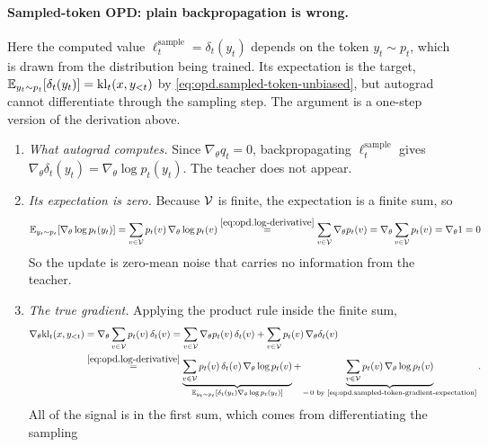 \paragraph{Sampled-token OPD: plain backpropagation is wrong.}
Here the computed value $\ell_t^{\mathrm{sample}}=\delta_t(y_t)$ depends on the token
$y_t\sim p_t$, which is drawn from the distribution being trained. Its expectation is
the target, $\mathbb{E}_{y_t\sim p_t}[\delta_t(y_t)]=\mathrm{kl}_t(x,y_{<t})$ by
\eqref{eq:opd.sampled-token-unbiased}, but autograd cannot differentiate through the
sampling step. The argument is a one-step version of the derivation above.
\begin{enumerate}
    \item \emph{What autograd computes.} Since $\nabla_\theta q_t=0$, backpropagating
    $\ell_t^{\mathrm{sample}}$ gives $\nabla_\theta\delta_t(y_t)=\nabla_\theta\log p_t(y_t)$.
    The teacher does not appear.
    \item \emph{Its expectation is zero.} Because ${\cal V}$ is finite, the expectation is
    a finite sum, so
    \begin{align}
        \mathbb{E}_{y_t\sim p_t}\!\left[\nabla_\theta\log p_t(y_t)\right]
        =
        \sum_{v\in{\cal V}}p_t(v)\,\nabla_\theta\log p_t(v)
        \overset{\eqref{eq:opd.log-derivative}}{=}
        \sum_{v\in{\cal V}}\nabla_\theta p_t(v)
        =
        \nabla_\theta\sum_{v\in{\cal V}}p_t(v)
        =
        \nabla_\theta 1
        =
        0 
        \label{eq:opd.sampled-token-gradient-expectation}
    \end{align}
    So the update is zero-mean noise that carries no information from the teacher.
    \item \emph{The true gradient.} Applying the product rule inside the finite sum,
    \begin{align*}
        \nabla_\theta\mathrm{kl}_t(x,y_{<t})
        &=
        \nabla_\theta\sum_{v\in{\cal V}}p_t(v)\,\delta_t(v)
        =
        \sum_{v\in{\cal V}}\nabla_\theta p_t(v)\,\delta_t(v)
        +
        \sum_{v\in{\cal V}}p_t(v)\,\nabla_\theta\delta_t(v)
        \\
        &\overset{\eqref{eq:opd.log-derivative}}{=}
        \underbrace{\sum_{v\in{\cal V}}p_t(v)\,\delta_t(v)\,\nabla_\theta\log p_t(v)}_{\mathbb{E}_{y_t\sim p_t}[\delta_t(y_t)\nabla_\theta\log p_t(y_t)]}
        +
        \underbrace{\sum_{v\in{\cal V}}p_t(v)\,\nabla_\theta\log p_t(v)}_{=\,0\text{ by \eqref{eq:opd.sampled-token-gradient-expectation}}}.
    \end{align*}
    All of the signal is in the first sum, which comes from differentiating the sampling

\end{enumerate}
